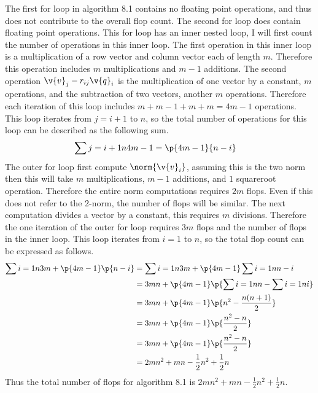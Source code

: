 \documentclass[11pt]{article}
\begin{document}
\begin{enumerate}
        The first for loop in algorithm 8.1 contains no floating point
        operations, and thus does not contribute to the overall flop count.
        The second for loop does contain floating point operations.
        This for loop has an inner nested loop, I will first count the
        number of operations in this inner loop.
        The first operation in this inner loop is a multiplication of a row
        vector and column vector each of length $m$.
        Therefore this operation includes $m$ multiplications and $m-1$
        additions.
        The second operation $\v{v}_j - r_{ij} \v{q}_i$ is the multiplication
        of one vector by a constant, $m$ operations, and the subtraction of
        two vectors, another $m$ operations.
        Therefore each iteration of this loop includes
        $m + m - 1 + m + m = 4m - 1$ operations.
        This loop iterates from $j = i + 1$ to $n$, so the total number of
        operations for this loop can be described as the following sum.
        \begin{align*}
            \sum{j = i+1}{n}{4m - 1} &= \p{4m - 1}{n - i}
        \end{align*}
        The outer for loop first compute $\norm{\v{v}_i}$, assuming this is
        the two norm then this will take $m$ multiplications, $m - 1$ additions,
        and $1$ squareroot operation.
        Therefore the entire norm computations requires $2m$ flops.
        Even if this does not refer to the 2-norm, the number of flops will be
        similar.
        The next computation divides a vector by a constant, this requires $m$
        divisions.
        Therefore the one iteration of the outer for loop requires $3m$ flops
        and the number of flops in the inner loop.
        This loop iterates from $i = 1$ to $n$, so the total flop count can be
        expressed as follows.
        \begin{align*}
            \sum{i = 1}{n}{3m + \p{4m - 1}\p{n-i}} &= \sum{i = 1}{n}{3m} + \p{4m-1}\sum{i=1}{n}{n-i} \\
            &= 3mn + \p{4m - 1}\p{\sum{i=1}{n}{n} - \sum{i=1}{n}{i}} \\
            &= 3mn + \p{4m - 1}\p{n^2 - \frac{n(n+1)}{2}} \\
            &= 3mn + \p{4m - 1}\p{\frac{n^2-n}{2}} \\
            &= 3mn + \p{4m - 1}\p{\frac{n^2-n}{2}} \\
            &= 2mn^2 + mn - \frac{1}{2}n^2 + \frac{1}{2}n
        \end{align*}
        Thus the total number of flops for algorithm 8.1 is
        $2mn^2 + mn - \frac{1}{2}n^2 + \frac{1}{2}n$.


\end{enumerate}
\end{document}
